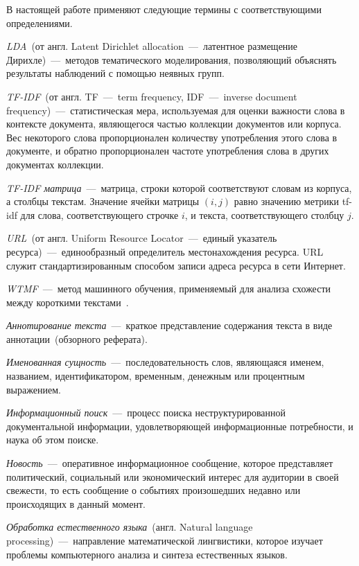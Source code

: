 \vocabularytitle
    В настоящей работе применяют следующие термины с соответствующими определениями.

    \textit{LDA}~(от англ. Latent Dirichlet allocation~---~латентное размещение Дирихле)~---~методов тематического моделирования, позволяющий объяснять результаты наблюдений с помощью неявных групп.

    \textit{TF-IDF}~(от англ. TF~---~term frequency, IDF~---~inverse document frequency)~---~статистическая мера, используемая для оценки важности слова в контексте документа, являющегося частью коллекции документов или корпуса. Вес некоторого слова пропорционален количеству употребления этого слова в документе, и обратно пропорционален частоте употребления слова в других документах коллекции.

    \textit{TF-IDF матрица}~---~матрица, строки которой соответствуют словам из корпуса, а столбцы текстам. Значение ячейки матрицы $(i,j)$ равно значению метрики tf-idf для слова, соответствующего строчке $i$, и текста, соответствующего столбцу $j$.

    \textit{URL}~(от англ. Uniform Resource Locator~---~единый указатель ресурса)~---~единообразный определитель местонахождения ресурса. URL служит стандартизированным способом записи адреса ресурса в сети Интернет.

    \textit{WTMF}~---~метод машинного обучения, применяемый для анализа схожести между короткими текстами~\cite{wtmf}.

    \textit{Аннотирование текста}~---~краткое представление содержания текста в виде аннотации~(обзорного реферата).

    \textit{Именованная сущность}~---~последовательность слов, являющаяся именем, названием, идентификатором, временным, денежным или процентным выражением.

    \textit{Информационный поиск}~---~процесс поиска неструктурированной документальной информации, удовлетворяющей информационные потребности, и наука об этом поиске.

    \textit{Новость}~---~оперативное информационное сообщение, которое представляет политический, социальный или экономический интерес для аудитории в своей свежести, то есть сообщение о событиях произошедших недавно или происходящих в данный момент.

    \textit{Обработка естественного языка}~(англ. Natural language processing)~---~направление математической лингвистики, которое изучает проблемы компьютерного анализа и синтеза естественных языков.

